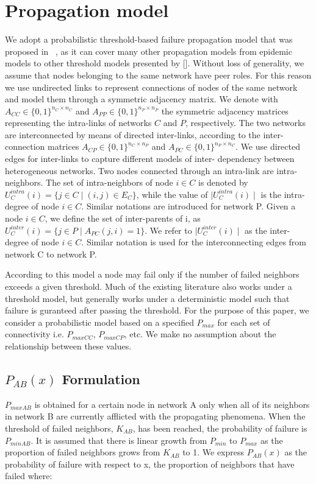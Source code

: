 \documentclass[letterpaper, 10 pt, conference]{ieeeconf}  %
\begin{document}
\section{Propagation model}
We adopt a probabilistic threshold-based failure propagation model that was proposed in ~\cite{c2}, as it can cover many other propagation models from epidemic models to other threshold models presented by []. Without loss of generality, we assume that nodes belonging to the same network have peer roles. For this reason we use undirected links to represent connections of nodes of the same network and model them through a symmetric adjacency matrix. We denote with $A_{CC}\in \{0,1\}^{n_{C}\times n_{C}}$ and $A_{PP}\in \{0,1\}^{n_{P}\times n_{P}}$ the symmetric adjacency matrices representing the intra-links of networks $C$ and $P$, respectively. The two networks are interconnected by means of directed inter-links, according to the inter-connection matrices $A_{CP}\in \{0,1\}^{n_{C}\times n_{P}}$ and $A_{PC}\in \{0,1\}^{n_{P}\times n_{C}}$. We use directed edges for inter-links to capture different models of inter- dependency between heterogeneous networks. Two nodes connected through an intra-link are intra-neighbors. The set of intra-neighbors of node $i\in C$ is denoted by $U_{C}^{intra}(i)=\{j\in {C}\mid (i,j)\in E_C\}$, while the value of $\mid U_{C}^{intra}(i) \mid$ is the intra-degree of node $i\in C$. Similar notations are introduced for network P. Given a node $i\in C$, we define the set of inter-parents of i, as $U_{C}^{inter}(i)=\{j\in {P}\mid A_{PC}(j,i)=1\}$. We refer to $\mid U_{C}^{inter}(i) \mid$ as the inter-degree of node $i\in C$. Similar notation is used for the interconnecting edges from network C to network P.

According to this model a node may fail only if the number of failed neighbors exceeds a given threshold.  Much of the existing literature also works under a threshold model, but generally works under a deterministic model such that failure is guranteed after passing the threshold.  For the purpose of this paper, we consider a probabilistic model based on a specified $P_{max}$ for each set of connectivity i.e. $P_{maxCC}$, $P_{maxCP}$, etc.  We make no assumption about the relationship between these values.

\subsection{$P_{AB}(x)$ Formulation}
$P_{maxAB}$ is obtained for a certain node in network A only when all of its neighbors in network B are currently afflicted with the propagating phenomena.  When the threshold of failed neighbors, $K_{AB}$, has been reached, the probability of failure is $P_{minAB}$.  It is assumed that there is linear growth from $P_{min}$ to $P_{max}$ as the proportion of failed neighbors grows from $K_{AB}$ to 1.  We express $P_{AB}(x)$ as the probability of failure with respect to x, the proportion of neighbors that have failed where:
\end{document}
